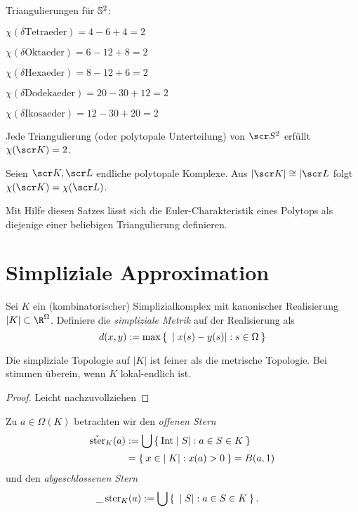 \begin{ex}
	Triangulierungen für $\S^2$:
	\begin{description}
		\item
			$\chi(\delta \text{Tetraeder}) = 4 - 6 + 4 = 2$
		\item
			$\chi(\delta \text{Oktaeder}) = 6 - 12 + 8 = 2$
		\item
			$\chi(\delta \text{Hexaeder}) = 8 - 12 + 6 = 2$
		\item
			$\chi(\delta \text{Dodekaeder}) = 20 - 30 + 12= 2$
		\item
			$\chi(\delta \text{Ikosaeder}) = 12 - 30 + 20= 2$
	\end{description}
\end{ex}

\begin{st}
	Jede Triangulierung (oder polytopale Unterteilung) von $\scr S^2$ erfüllt $\chi(\scr K) = 2$.
\end{st}

\begin{st}
	Seien $\scr K, \scr L$ endliche polytopale Komplexe.
	Aus $|\scr K| \homeomorphic |\scr L$ folgt $\chi(\scr K) = \chi(\scr L)$.
	\begin{note}
		Mit Hilfe diesen Satzes lässt sich die Euler-Charakteristik eines Polytops als diejenige einer beliebigen Triangulierung definieren.
	\end{note}
\end{st}


\section{Simpliziale Approximation}


\begin{df}
	Sei $K$ ein (kombinatorischer) Simplizialkomplex mit kanonischer Realisierung $|K| \subset \R^{\Omega}$.
	Definiere die \emph{simpliziale Metrik} auf der Realisierung als
	\[
		d(x,y) :=
		\max \Set{ |x(s) - y(s)| : s \in \Omega }
	\]
\end{df}

\begin{st}
	Die simpliziale Topologie auf $|K|$ ist feiner als die metrische Topologie.
	Bei stimmen überein, wenn $K$ lokal-endlich ist.
	\begin{proof}
		Leicht nachzuvollziehen
	\end{proof}
\end{st}

\begin{df}
	Zu $a \in \Omega(K)$ betrachten wir den \emph{offenen Stern}
	\begin{align*}
		\mathring \stern_K(a)
		&:= \bigcup \Set{ \Int |S| : a \in S \in K } \\
		&= \Set{ x \in |K| : x(a) > 0 }
		= B(a, 1)
	\end{align*}
	und den \emph{abgeschlossenen Stern}
	\begin{align*}
		\_\stern_K(a)
		&:= \bigcup \Set{ |S| : a \in S \in K }.
	\end{align*}
\end{df}


